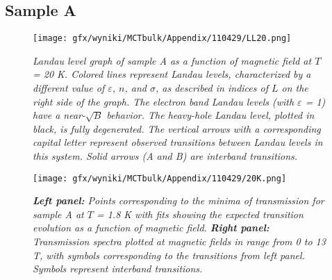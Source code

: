 \documentclass[titlepage,a4paper]{book}
\begin{document}
\subsection{Sample A}
\begin{figure}[ht]
	\centering
	\texttt{[image: gfx/wyniki/MCTbulk/Appendix/110429/LL20.png]}
	\vspace{-10pt}
	\caption{\textit{Landau level graph of sample A as a function of magnetic field at $T$ = 20 K. Colored lines represent Landau levels, characterized by a different value of $\varepsilon$, $n$, and $\sigma$, as described in indices of $L$ on the right side of the graph. The electron band Landau levels (with $\varepsilon$ = 1) have a near-$\sqrt{B}$ behavior. The heavy-hole Landau level, plotted in black, is fully degenerated. The vertical arrows with a corresponding capital letter represent observed transitions between Landau levels in this system. Solid arrows (A and B) are interband transitions.}}
	\label{fig:LL_110429_20K}
\end{figure}
\begin{figure}[ht]
	\centering
	\texttt{[image: gfx/wyniki/MCTbulk/Appendix/110429/20K.png]}
	\vspace{-10pt}
	\caption{\textit{\textbf{Left panel:} Points corresponding to the minima of transmission for sample A at $T$ = 1.8 K with fits showing the expected transition evolution as a function of magnetic field. \textbf{Right panel:} Transmission spectra plotted at magnetic fields in range from 0 to 13 T, with symbols corresponding to the transitions from left panel. Symbols represent interband transitions.}}
	\label{fig:Spectra_110429_20K}
\end{figure} 
\end{document}
